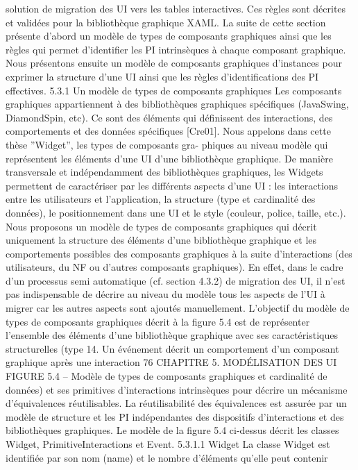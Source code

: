 \documentclass{article}
\begin{document}
solution de migration des UI vers les tables interactives. Ces règles sont décrites et validées pour la
bibliothèque graphique XAML.
La suite de cette section présente d’abord un modèle de types de composants graphiques ainsi que
les règles qui permet d’identiﬁer les PI intrinsèques à chaque composant graphique. Nous présentons
ensuite un modèle de composants graphiques d’instances pour exprimer la structure d’une UI ainsi
que les règles d’identiﬁcations des PI effectives.
5.3.1
Un modèle de types de composants graphiques
Les composants graphiques appartiennent à des bibliothèques graphiques spéciﬁques (JavaSwing,
DiamondSpin, etc). Ce sont des éléments qui déﬁnissent des interactions, des comportements et des
données spéciﬁques [Cre01]. Nous appelons dans cette thèse ”Widget”, les types de composants gra-
phiques au niveau modèle qui représentent les éléments d’une UI d’une bibliothèque graphique.
De manière transversale et indépendamment des bibliothèques graphiques, les Widgets permettent
de caractériser par les différents aspects d’une UI : les interactions entre les utilisateurs et l’application,
la structure (type et cardinalité des données), le positionnement dans une UI et le style (couleur, police,
taille, etc.). Nous proposons un modèle de types de composants graphiques qui décrit uniquement la
structure des éléments d’une bibliothèque graphique et les comportements possibles des composants
graphiques à la suite d’interactions (des utilisateurs, du NF ou d’autres composants graphiques). En
effet, dans le cadre d’un processus semi automatique (cf. section 4.3.2) de migration des UI, il n’est
pas indispensable de décrire au niveau du modèle tous les aspects de l’UI à migrer car les autres
aspects sont ajoutés manuellement.
L’objectif du modèle de types de composants graphiques décrit à la ﬁgure 5.4 est de représenter
l’ensemble des éléments d’une bibliothèque graphique avec ses caractéristiques structurelles (type
14. Un événement décrit un comportement d’un composant graphique après une interaction
76
CHAPITRE 5. MODÉLISATION DES UI
FIGURE 5.4 – Modèle de types de composants graphiques
et cardinalité de données) et ses primitives d’interactions intrinsèques pour décrire un mécanisme
d’équivalences réutilisables. La réutilisabilité des équivalences est assurée par un modèle de structure
et les PI indépendantes des dispositifs d’interactions et des bibliothèques graphiques.
Le modèle de la ﬁgure 5.4 ci-dessus décrit les classes Widget, PrimitiveInteractions et Event.
5.3.1.1
Widget
La classe Widget est identiﬁée par son nom (name) et le nombre d’éléments qu’elle peut contenir
\end{document}
